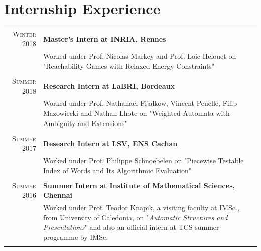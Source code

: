\documentclass[a4paper,10pt]{article}
\begin{document}
\section{Internship Experience}
\begin{longtable}{r|p{11cm}}

\textsc {Winter 2018} & \textbf {Master's Intern at INRIA, Rennes}\\
& Worked under Prof. Nicolas Markey and Prof. Loic Helouet  on "Reachability Games with Relaxed Energy Constraints"\\&\\


\textsc {Summer 2018} & \textbf {Research Intern at LaBRI, Bordeaux}\\
& Worked under Prof. Nathanael Fijalkow, Vincent Penelle, Filip Mazowiecki and Nathan Lhote  on "Weighted Automata with Ambiguity and Extensions"\\&\\

\textsc {Summer 2017} & \textbf {Research Intern at LSV, ENS Cachan}\\
& Worked under Prof. Philippe Schnoebelen  on "Piecewise Testable Index of Words
and Its Algorithmic Evaluation"\\&\\

 \textsc {Summer 2016} & \textbf {Summer Intern at Institute of Mathematical Sciences, Chennai}\\
& Worked under Prof. Teodor Knapik, a visiting faculty at IMSc., from University of Caledonia, on "\emph{Automatic Structures and Presentations}" and also an official intern at TCS summer programme by IMSc.\\&\\

\end{longtable}
\end{document}
